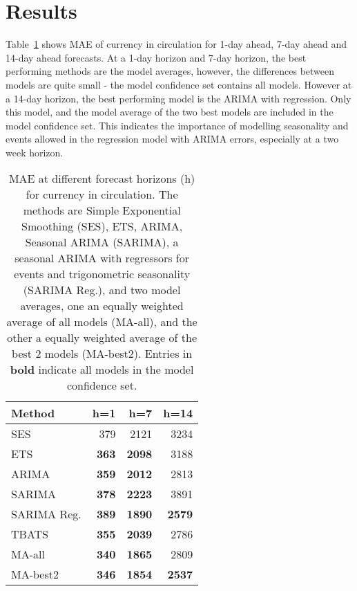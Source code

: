 \section{Results}\label{sec:res}

Table~\ref{tab:cicsum} shows MAE of currency in circulation for 1-day ahead, 7-day ahead and 14-day ahead forecasts. At a 1-day horizon and 7-day horizon, the best performing methods are the model averages, however, the differences between models are quite small - the model confidence set contains all models. However at a 14-day horizon, the best performing model is the ARIMA with regression. Only this model, and the model average of the two best models are included in the model confidence set. This indicates the importance of modelling seasonality and events allowed in the regression model with ARIMA errors, especially at a two week horizon.

\begin{table}[!ht]
\centering
\begin{tabular}{lrrr}
  \hline
Method & h=1 & h=7 & h=14 \\ 
  \hline
SES & 379 & 2121 & 3234 \\ 
  ETS & \textbf{363} & \textbf{2098} & 3188 \\ 
  ARIMA & \textbf{359} & \textbf{2012} & 2813 \\ 
  SARIMA & \textbf{378} & \textbf{2223} & 3891 \\ 
  SARIMA Reg. & \textbf{389} & \textbf{1890} & \textbf{2579} \\ 
  TBATS & \textbf{355} & \textbf{2039} & 2786 \\ 
  MA-all & \textbf{340} & \textbf{1865} & 2809 \\ 
  MA-best2 & \textbf{346} & \textbf{1854} & \textbf{2537} \\ 
   \hline
\end{tabular}
\caption{MAE at different forecast horizons (h) for currency in circulation. The methods are Simple Exponential Smoothing (SES), ETS, ARIMA, Seasonal ARIMA (SARIMA), a seasonal ARIMA with regressors for events and trigonometric seasonality (SARIMA Reg.), and two model averages, one an equally weighted average of all models (MA-all), and the other a equally weighted average of the best 2 models (MA-best2). Entries in \textbf{bold} indicate all models in the model confidence set.} 
\label{tab:cicsum}
\end{table}

